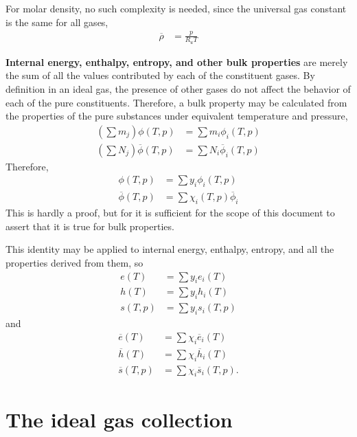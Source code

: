 For molar density, no such complexity is needed, since the universal gas constant is the same for all gases,
\begin{align}
\overline{\rho} &= \frac{p}{R_u T}\nonumber
\end{align}

{\bf Internal energy, enthalpy, entropy, and other bulk properties} are merely the sum of all the values contributed by each of the constituent gases.  By definition in an ideal gas, the presence of other gases do not affect the behavior of each of the pure constituents.  Therefore, a bulk property may be calculated from the properties of the pure substances under equivalent temperature and pressure,
\begin{align}
\left(\sum m_j\right) \phi(T,p) &= \sum m_i \phi_i(T,p)\nonumber\\
\left(\sum N_j \right) \overline{\phi}(T,p) &= \sum N_i \overline{\phi}_i(T,p)\nonumber
\end{align}
Therefore, 
\begin{align}
\phi(T,p) &= \sum y_i \phi_i(T,p)\nonumber\\
\overline{\phi}(T,p) &= \sum \chi_i(T,p) \overline{\phi}_i\nonumber
\end{align}
This is hardly a proof, but for it is sufficient for the scope of this document to assert that it is true for bulk properties.

This identity may be applied to internal energy, enthalpy, entropy, and all the properties derived from them, so
\begin{subequations}
\begin{align}
e(T) &= \sum y_i e_i(T)\\
h(T) &= \sum y_i h_i(T)\\
s(T,p) &= \sum y_i s_i(T,p)
\end{align}
\end{subequations}
and
\begin{subequations}
\begin{align}
\overline{e}(T) &= \sum \chi_i \overline{e}_i(T)\\
\overline{h}(T) &= \sum \chi_i \overline{h}_i(T)\\
\overline{s}(T,p) &= \sum \chi_i \overline{s}_i(T,p).
\end{align}
\end{subequations}


\section{The ideal gas collection}

